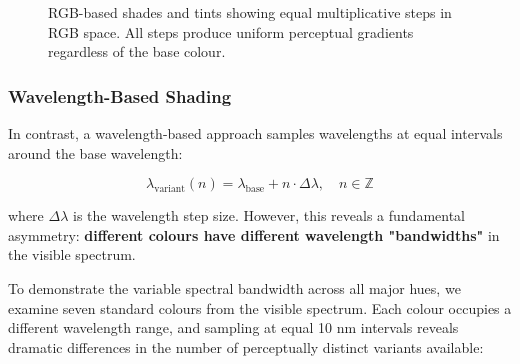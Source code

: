 \documentclass[12pt,a4paper]{article}
\newcommand{\wavelength}{\lambda}
\begin{document}
\begin{figure}[H]
\centering
{}
\caption{RGB-based shades and tints showing equal multiplicative steps in RGB space. All steps produce uniform perceptual gradients regardless of the base colour.}
\label{fig:rgb-tints-shades-bar}
\end{figure}

\subsubsection{Wavelength-Based Shading}

In contrast, a wavelength-based approach samples wavelengths at equal intervals around the base wavelength:

\begin{equation}
\wavelength_{\text{variant}}(n) = \wavelength_{\text{base}} + n \cdot \Delta\wavelength, \quad n \in \mathbb{Z}
\end{equation}

where $\Delta\wavelength$ is the wavelength step size. However, this reveals a fundamental asymmetry: \textbf{different colours have different wavelength "bandwidths"} in the visible spectrum.

To demonstrate the variable spectral bandwidth across all major hues, we examine seven standard colours from the visible spectrum. Each colour occupies a different wavelength range, and sampling at equal 10 nm intervals reveals dramatic differences in the number of perceptually distinct variants available:
\end{document}
